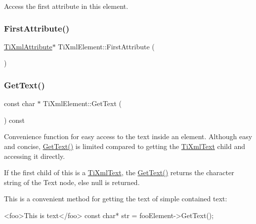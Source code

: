Access the first attribute in this element. 

\mbox{\label{class_ti_xml_element_a4b33780fc565d38d6b54f640e0cf1737}} 
\subsubsection{\texorpdfstring{First\+Attribute()}{FirstAttribute()}\hspace{0.1cm}{\footnotesize\ttfamily [2/2]}}
{\footnotesize\ttfamily \hyperlink{class_ti_xml_attribute}{Ti\+Xml\+Attribute}$\ast$ Ti\+Xml\+Element\+::\+First\+Attribute (\begin{DoxyParamCaption}{ }\end{DoxyParamCaption})\hspace{0.3cm}{\ttfamily [inline]}}

\mbox{\label{class_ti_xml_element_af0f814ecbd43d50d4cdbdf4354d3da39}} 
\subsubsection{\texorpdfstring{Get\+Text()}{GetText()}}
{\footnotesize\ttfamily const char $\ast$ Ti\+Xml\+Element\+::\+Get\+Text (\begin{DoxyParamCaption}{ }\end{DoxyParamCaption}) const}

Convenience function for easy access to the text inside an element. Although easy and concise, \hyperlink{class_ti_xml_element_af0f814ecbd43d50d4cdbdf4354d3da39}{Get\+Text()} is limited compared to getting the \hyperlink{class_ti_xml_text}{Ti\+Xml\+Text} child and accessing it directly.

If the first child of \textquotesingle{}this\textquotesingle{} is a \hyperlink{class_ti_xml_text}{Ti\+Xml\+Text}, the \hyperlink{class_ti_xml_element_af0f814ecbd43d50d4cdbdf4354d3da39}{Get\+Text()} returns the character string of the Text node, else null is returned.

This is a convenient method for getting the text of simple contained text\+: \begin{DoxyVerb}<foo>This is text</foo>
const char* str = fooElement->GetText();
\end{DoxyVerb}


